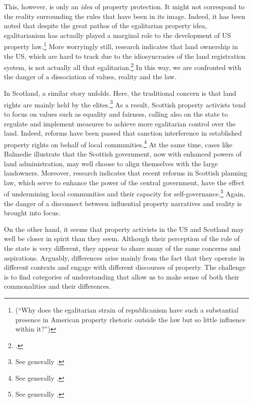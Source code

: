 This, however, is only an {\it idea} of property protection. It might not correspond to the reality surrounding the rules that have been  in its image. Indeed, it has been noted that despite the great pathos of the egalitarian property idea, egalitarianism has actually played a marginal role to the development of US property law.\footnote{\cite[361]{williams98} (``Why does the egalitarian strain of republicanism have such a substantial presence in American property rhetoric outside the law but so little influence within it?'')} More worryingly still, research indicates that land ownership in the US, which are hard to track due to the idiosyncrasies of the land registration system, is not actually all that egalitarian.\footcite[246-247]{jacobs98} In this way, we are confronted with the danger of a dissociation of values, reality and the law.

In Scotland, a similar story unfolds. Here, the traditional concern is that land rights are mainly held by the elites.\footnote{See generally \cite{wightman96,wightman13}.} As a result, Scottish property activists tend to focus on values such as equality and fairness, calling also on the state to regulate and implement measures to achieve more egalitarian control over the land. Indeed, reforms have been passed that sanction interference in established property rights on behalf of local communities.\footnote{See generally \cite{lovett11,hoffman13}.} At the same time, cases like Balmedie illustrate that the Scottish government, now with enhanced powers of land administration, may well choose to align themselves with the large landowners. Moreover, research indicates that recent reforms in Scottish planning law, which serve to enhance the power of the central government, have the effect of undermining local communities and their capacity for self-governance.\footnote{See generally \cite{pacione13,pacione14}.} Again, the danger of a disconnect between influential property narratives and reality is brought into focus.

On the other hand, it seems that  property activists in the US and Scotland may well be closer in spirit than they seem. Although their perception of the role of the state is very different, they appear to share many of the same concerns and aspirations. Arguably, differences arise mainly from the fact that they operate in different contexts and engage with different discourses of property. The challenge is to find categories of understanding that allow us to make sense of both their commonalities and their differences.

